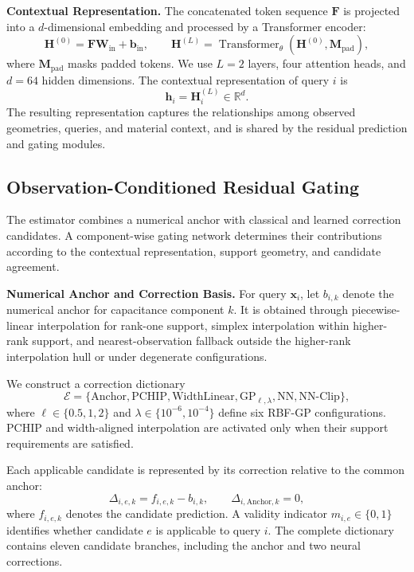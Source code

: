 \documentclass[conference,9pt,letterpaper]{IEEEtran}
\begin{document}
\textbf{Contextual Representation.}
The concatenated token sequence
$\mathbf{F}$ is projected into a $d$-dimensional
embedding and processed by a Transformer encoder:
\begin{equation}
\mathbf{H}^{(0)}
=
\mathbf{F}\mathbf{W}_{\mathrm{in}}+\mathbf{b}_{\mathrm{in}},
\qquad
\mathbf{H}^{(L)}
=
\operatorname{Transformer}_{\theta}
(\mathbf{H}^{(0)},\mathbf{M}_{\mathrm{pad}}),
\label{eq:context_encoder}
\end{equation}
where $\mathbf{M}_{\mathrm{pad}}$ masks padded tokens.
We use $L=2$ layers, four attention heads, and
$d=64$ hidden dimensions. The contextual
representation of query $i$ is
\begin{equation}
\mathbf{h}_i=\mathbf{H}^{(L)}_i
\in\mathbb{R}^{d}.
\label{eq:context_embedding}
\end{equation}
The resulting representation captures the
relationships among observed geometries, queries,
and material context, and is shared by the residual
prediction and gating modules.


\subsection{Observation-Conditioned Residual Gating}

The estimator combines a numerical anchor with
classical and learned correction candidates.
A component-wise gating network determines their
contributions according to the contextual
representation, support geometry, and candidate
agreement.

\textbf{Numerical Anchor and Correction Basis.}
For query $\mathbf{x}_i$, let $b_{i,k}$ denote the
numerical anchor for capacitance component $k$.
It is obtained through piecewise-linear interpolation
for rank-one support, simplex interpolation within
higher-rank support, and nearest-observation fallback
outside the higher-rank interpolation hull or under
degenerate configurations.

We construct a correction dictionary
\begin{equation}
\mathcal{E}=
\{
\mathrm{Anchor},
\mathrm{PCHIP},
\mathrm{WidthLinear},
\mathrm{GP}_{\ell,\lambda},
\mathrm{NN},
\mathrm{NN\text{-}Clip}
\},
\label{eq:correction_basis}
\end{equation}
where $\ell\in\{0.5,1,2\}$ and
$\lambda\in\{10^{-6},10^{-4}\}$ define six
RBF-GP configurations. PCHIP and width-aligned
interpolation are activated only when their
support requirements are satisfied.

Each applicable candidate is represented by its
correction relative to the common anchor:
\begin{equation}
\Delta_{i,e,k}=f_{i,e,k}-b_{i,k},
\qquad
\Delta_{i,\mathrm{Anchor},k}=0,
\label{eq:correction}
\end{equation}
where $f_{i,e,k}$ denotes the candidate prediction.
A validity indicator $m_{i,e}\in\{0,1\}$ identifies
whether candidate $e$ is applicable to query $i$.
The complete dictionary contains eleven candidate
branches, including the anchor and two neural
corrections.
\end{document}
